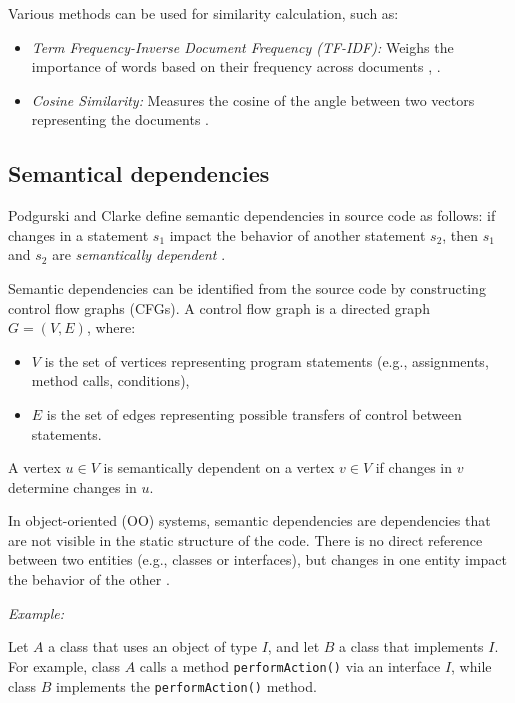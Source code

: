 Various methods can be used for similarity calculation, such as:
\begin{itemize}
    \item \textit{Term Frequency-Inverse Document Frequency (TF-IDF):} Weighs the importance of words based on their frequency across documents \cite{lexical-dep}, \cite{corazza2}.
    \item \textit{Cosine Similarity:} Measures the cosine of the angle between two vectors representing the documents \cite{lexical-dep-Prajapati}.
\end{itemize}






\subsection{Semantical dependencies}

\hspace{4em} Podgurski and Clarke define semantic dependencies in source code as follows: if changes in a statement \(s_1\) impact the behavior of another statement \(s_2\), then \(s_1\) and \(s_2\) are \emph{semantically dependent} \cite{Podgurski-semantic}.

Semantic dependencies can be identified from the source code by constructing control flow graphs (CFGs). A control flow graph is a directed graph \(G = (V, E)\), where:
\begin{itemize}
    \item \(V\) is the set of vertices representing program statements (e.g., assignments, method calls, conditions),
    \item \(E\) is the set of edges representing possible transfers of control between statements.
\end{itemize}

A vertex \(u \in V\) is semantically dependent on a vertex \(v \in V\) if changes in \(v\) determine changes in \(u\).

In object-oriented (OO) systems, semantic dependencies are dependencies that are not visible in the static structure of the code. There is no direct reference between two entities (e.g., classes or interfaces), but changes in one entity impact the behavior of the other \cite{Neto-semantic-dep, Capiluppi-semantic-dep, Poshyvanyk2009}. 


\textit{Example:}

Let \(A\) a class that uses an object of type \(I\), and let \(B\) a class that implements \(I\). For example, class \(A\) calls a method \texttt{performAction()} via an interface \(I\), while class \(B\) implements the \texttt{performAction()} method.

